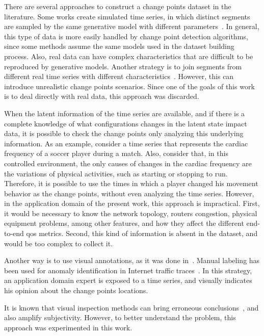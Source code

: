 There are several approaches to construct a
change points dataset in the literature.
Some works create simulated time series, in which distinct segments are sampled
by the same generative model with different
parameters~\cite{change_point_detection_in_time_series_data_by_relative_density_ratio_estimation}.
In general, this type of data is more easily handled by change point detection
algorithms, since some methods assume the same models used in the dataset
building process. Also, real data can have complex characteristics that are
difficult to be reproduced by generative models. Another strategy is to join
segments from different real time series with different
characteristics~\cite{inertial_hidden_markov_models_modeling_change_in_multivariate_time_series}.
However, this can introduce unrealistic change points scenarios. Since one of
the goals of this work is to deal directly with real data,
this approach was discarded.

When the latent information of the time series are available, and if there is a
complete knowledge of what configurations changes in the latent state impact
data, it is possible to check the change points only analyzing this underlying
information. As an example, consider a time series that represents the cardiac
frequency of a soccer player during a match. Also, consider that, in this
controlled environment, the only causes of changes in the cardiac frequency are
the variations of physical activities, such as starting or stopping to run.
Therefore,
it is possible to use the times in which a player changed his movement behavior
as the change points, without even analyzing the time series. However, in the
application domain of the present work, this approach is impractical.
First, it would be necessary to know the network
topology, routers congestion, physical equipment problems, among other features,
and how they affect the different end-to-end \gls*{qos} metrics.
Second, this kind of information is absent in the dataset, and would be too
complex to collect it.

Another way is to use visual annotations,
as it was done
in~\cite{learning_sparse_penalties_for_change_point_detection_using_max_margin_interval_regression}.
Manual labeling has been used for anomaly identification in Internet traffic
traces~\cite{webclass_adding_rigor_to_manual_labeling_of_traffic_anomalies}.
In this strategy, an application domain expert is exposed to a time series,
and visually indicates his opinion about the change points locations.

It is known that visual inspection methods can bring erroneous
conclusions~\cite{leveraging_cloud_data_to_mitigate_user_experience_from_breaking_bad},
and also amplify subjectivity. However, to better understand the problem, this
approach was experimented in this work.


